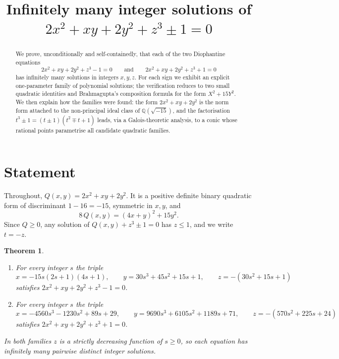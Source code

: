 \documentclass[11pt]{article}
\title{Infinitely many integer solutions of\\ $2x^{2}+xy+2y^{2}+z^{3}\pm1=0$}
\author{}
\date{}
\newtheorem{theorem}{Theorem}
\theoremstyle{remark}
\newcommand{\Q}{\mathbb{Q}}
\begin{document}
\maketitle

\begin{abstract}
We prove, unconditionally and self-containedly, that each of the two Diophantine equations
\[
2x^{2}+xy+2y^{2}+z^{3}-1=0 \qquad\text{and}\qquad 2x^{2}+xy+2y^{2}+z^{3}+1=0
\]
has infinitely many solutions in integers $x,y,z$. For each sign we exhibit an explicit one-parameter
family of polynomial solutions; the verification reduces to two small quadratic identities and
Brahmagupta's composition formula for the form $X^{2}+15Y^{2}$. We then explain how the
families were found: the form $2x^{2}+xy+2y^{2}$ is the norm form attached to the non-principal
ideal class of $\Q(\sqrt{-15})$, and the factorisation $t^{3}\pm1=(t\pm1)(t^{2}\mp t+1)$ leads,
via a Galois-theoretic analysis, to a conic whose rational points parametrise all candidate
quadratic families.
\end{abstract}

\section{Statement}

Throughout, $Q(x,y)=2x^{2}+xy+2y^{2}$. It is a positive definite binary quadratic form of
discriminant $1-16=-15$, symmetric in $x,y$, and
\begin{equation}\label{eq:8Q}
8\,Q(x,y)=(4x+y)^{2}+15y^{2}.
\end{equation}
Since $Q\ge 0$, any solution of $Q(x,y)+z^{3}\pm1=0$ has $z\le 1$, and we write $t=-z$.

\begin{theorem}\label{thm:main}
\begin{enumerate}
\item[(A)] For every integer $s$ the triple
\[
x=-15s(2s+1)(4s+1),\qquad y=30s^{3}+45s^{2}+15s+1,\qquad z=-(30s^{2}+15s+1)
\]
satisfies $2x^{2}+xy+2y^{2}+z^{3}-1=0$.
\item[(B)] For every integer $s$ the triple
\[
x=-4560s^{3}-1230s^{2}+89s+29,\qquad y=9690s^{3}+6105s^{2}+1189s+71,\qquad z=-(570s^{2}+225s+24)
\]
satisfies $2x^{2}+xy+2y^{2}+z^{3}+1=0$.
\end{enumerate}
In both families $z$ is a strictly decreasing function of $s\ge0$, so each equation has
infinitely many pairwise distinct integer solutions.
\end{theorem}
\end{document}
